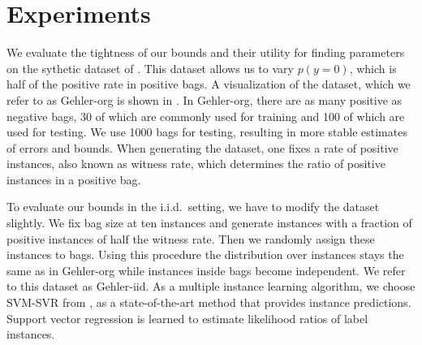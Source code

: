\section{Experiments}
We evaluate the tightness of our bounds and their utility for finding parameters on the sythetic dataset of \citet{gehler2007deterministic}.
This dataset allows us to vary $p(y=0)$, which is half of the positive rate in positive bags.
A visualization of the dataset, which we refer to as Gehler-org is shown in . In Gehler-org, there are as many positive
as negative bags, 30 of which are commonly used for training and 100 of which are used for testing.
We use 1000 bags for testing, resulting in more stable estimates of errors and bounds.
When generating the dataset, one fixes a rate of positive instances, also known as witness rate, which determines the ratio
of positive instances in a positive bag.

To evaluate our bounds in the i.i.d.\ setting, we have to modify the dataset slightly. We fix bag size at ten instances and generate instances
with a fraction of positive instances of half the witness rate. Then we randomly assign these instances to bags.
Using this procedure the distribution over instances stays the same as in Gehler-org while instances inside bags become independent.
We refer to this dataset as Gehler-iid.
As a multiple instance learning algorithm, we choose SVM-SVR from \citet{liconvex2010}, as a state-of-the-art method that
provides instance predictions. Support vector regression is learned to estimate likelihood ratios of label instances.

